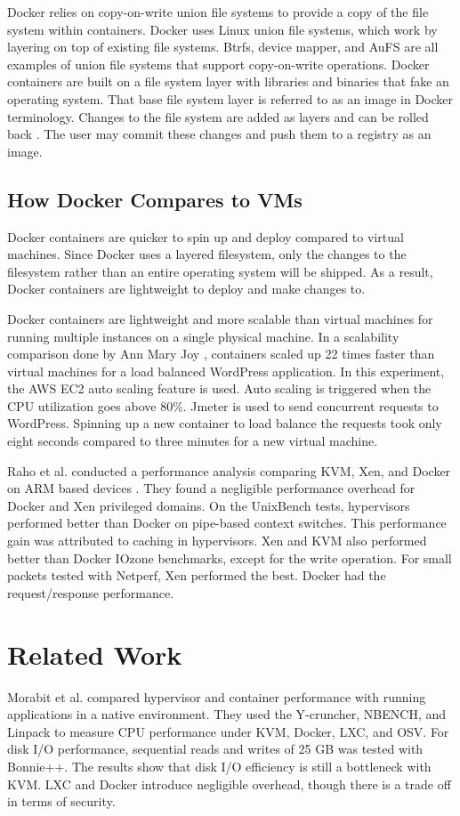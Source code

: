 \documentclass[11pt]{article}
\begin{document}
Docker relies on copy-on-write union file systems to provide a copy of the file system within containers. Docker uses Linux union file systems, which work by layering on top of existing file systems. Btrfs, device mapper, and AuFS are all examples of union file systems that support copy-on-write operations. Docker containers are built on a file system layer with libraries and binaries that fake an operating system. That base file system layer is referred to as an image in Docker terminology. Changes to the file system are added as layers and can be rolled back \cite{anderson}. The user may commit these changes and push them to a registry as an image. 


\subsection{How Docker Compares to VMs}
Docker containers are quicker to spin up and deploy compared to virtual machines. Since Docker uses a layered filesystem, only the changes to the filesystem rather than an entire operating system will be shipped. As a result, Docker containers are lightweight to deploy and make changes to. 

Docker containers are lightweight and more scalable than virtual machines for running multiple instances on a single physical machine. In a scalability comparison done by Ann Mary Joy \cite{joy}, containers scaled up 22 times faster than virtual machines for a load balanced WordPress application. In this experiment, the AWS EC2 auto scaling feature is used. Auto scaling is triggered when the CPU utilization goes above 80\%. Jmeter is used to send concurrent requests to WordPress. Spinning up a new container to load balance the requests took only eight seconds compared to three minutes for a new virtual machine. 

Raho et al. conducted a performance analysis comparing KVM, Xen, and Docker on ARM based devices \cite{raho}. They found a negligible performance overhead for Docker and Xen privileged domains. On the UnixBench tests, hypervisors performed better than Docker on pipe-based context switches. This performance gain was attributed to caching in hypervisors. Xen and KVM also performed better than Docker IOzone benchmarks, except for the write operation. For small packets tested with Netperf, Xen performed the best. Docker had the request/response performance. 

\section{Related Work}
Morabit et al. \cite{morabito} compared hypervisor and container performance with running applications in a native environment. They used the Y-cruncher, NBENCH, and Linpack to measure CPU performance under KVM, Docker, LXC, and OSV. For disk I/O performance, sequential reads and writes of 25 GB was tested with Bonnie++. The results show that disk I/O efficiency is still a bottleneck with KVM. LXC and Docker introduce negligible overhead, though there is a trade off in terms of security. 
\end{document}
